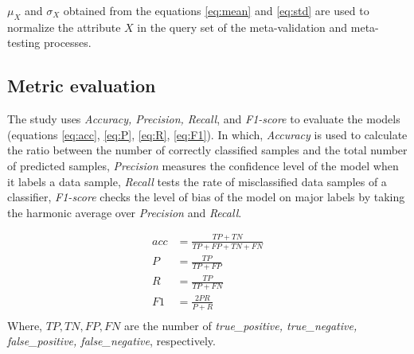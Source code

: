 
$\mu_{X}$ and $\sigma_{X}$ obtained from the equations \ref{eq:mean} and \ref{eq:std} are used to normalize the attribute $X$ in the query set of the meta-validation and meta-testing processes.

\subsection{Metric evaluation}


The study uses \textit{Accuracy, Precision, Recall}, and \textit{F1-score} to evaluate the models (equations \ref{eq:acc}, \ref{eq:P}, \ref{eq:R}, \ref{eq:F1}). In which, \textit{Accuracy} is used to calculate the ratio between the number of correctly classified samples and the total number of predicted samples, \textit{Precision} measures the confidence level of the model when it labels a data sample, \textit{Recall} tests the rate of misclassified data samples of a classifier, \textit{F1-score} checks the level of bias of the model on major labels by taking the harmonic average over \textit{Precision} and \textit{Recall}.

\begin{align}
    acc &= \frac{TP+TN}{TP+FP+TN+FN}\label{eq:acc}\\
    P &= \frac{TP}{TP+FP}\label{eq:P}\\
    R &= \frac{TP}{TP+FN}\label{eq:R}\\
    F1 &= \frac{2PR}{P+R}\label{eq:F1}\\
\end{align}Where, $TP, TN, FP, FN$ are the number of \textit{true\_positive, true\_negative, false\_positive, false\_negative}, respectively.

